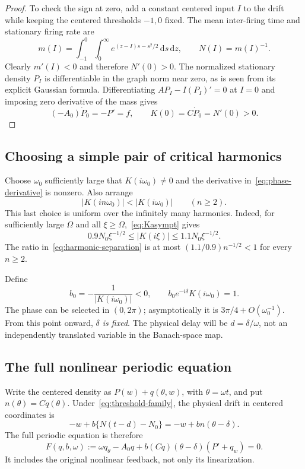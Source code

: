 \documentclass[11pt,a4paper]{article}
\numberwithin{equation}{section}
\theoremstyle{remark}\newtheorem{remark}[theorem]{Remark}
\newcommand{\dd}{\,\mathrm d}
\begin{document}
\begin{proof}
To check the sign at zero, add a constant centered input $I$ to the drift while keeping the centered thresholds $-1,0$ fixed. The mean inter-firing time and stationary firing rate are
\[
 m(I)=\int_{-1}^0\int_0^\infty e^{(z-I)s-s^2/2}\dd s\dd z,
 \qquad N(I)=m(I)^{-1}.
\]
Clearly $m'(I)<0$ and therefore $N'(0)>0$. The normalized stationary density $P_I$ is differentiable in the graph norm near zero, as is seen from its explicit Gaussian formula. Differentiating $AP_I-I(P_I)'=0$ at $I=0$ and imposing zero derivative of the mass gives
\[
 (-A_0)\dot P_0=-P'=f,
 \qquad K(0)=C\dot P_0=N'(0)>0.
\]
\end{proof}

\subsection{Choosing a simple pair of critical harmonics}
Choose $\omega_0$ sufficiently large that $K(i\omega_0)\ne0$ and the derivative in~\eqref{eq:phase-derivative} is nonzero. Also arrange
\begin{equation}\label{eq:harmonic-separation}
 |K(in\omega_0)|<|K(i\omega_0)|\qquad(n\geq2).
\end{equation}
This last choice is uniform over the infinitely many harmonics. Indeed, for sufficiently large $\Omega$ and all $\xi\geq\Omega$,~\eqref{eq:Kasympt} gives
\[
 0.9N_0\xi^{-1/2}\leq|K(i\xi)|\leq1.1N_0\xi^{-1/2}.
\]
The ratio in~\eqref{eq:harmonic-separation} is at most
$(1.1/0.9)n^{-1/2}<1$ for every $n\geq2$.

Define
\begin{equation}\label{eq:criticalparams}
 b_0=-\frac1{|K(i\omega_0)|}<0,
 \qquad b_0e^{-i\delta}K(i\omega_0)=1.
\end{equation}
The phase can be selected in $(0,2\pi)$; asymptotically it is $3\pi/4+O(\omega_0^{-1})$. From this point onward, \emph{$\delta$ is fixed}. The physical delay will be $d=\delta/\omega$, not an independently translated variable in the Banach-space map.

\subsection{The full nonlinear periodic equation}
Write the centered density as $P(w)+q(\theta,w)$, with $\theta=\omega t$, and put $n(\theta)=Cq(\theta)$. Under~\eqref{eq:threshold-family}, the physical drift in centered coordinates is
\[
 -w+b\{N(t-d)-N_0\}=-w+b n(\theta-\delta).
\]
The full periodic equation is therefore
\begin{equation}\label{eq:nonlinearF}
 F(q,b,\omega):=\omega q_\theta-A_0q
       +b(Cq)(\theta-\delta)(P'+q_w)=0.
\end{equation}
It includes the original nonlinear feedback, not only its linearization.
\end{document}
